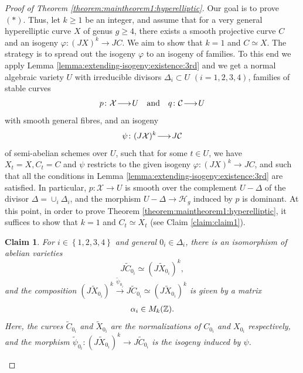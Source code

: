 \documentclass[a4paper,11pt,reqno]{amsart}
\makeatletter
\numberwithin{equation}{section}
\theoremstyle{plain}
\newtheorem{claim}[theorem]{Claim}
\theoremstyle{definition}
\newcommand{\Z}{\mathbb Z}
\let\rm\relax
\newcommand{\rm}[1]{{\mathrm{#1}}}
\newcommand{\ca}[1]{{\mathcal{#1}}}
\newcommand{\wt}[1]{{\widetilde{#1}}}
\renewcommand{\longrightarrow}{\xymatrix@1@=15pt{\ar[r]&}}
\renewcommand{\cong}{\simeq}
\newcommand{\set}[1]{\left\{ #1 \right\}}
\makeatother
\begin{document}
\begin{proof}[Proof of Theorem \ref{theorem:maintheorem1:hyperelliptic}]
Our goal is to prove \hyperlink{star}{$(\ast)$}. 
Thus, let $k \geq 1$ be an integer, and assume that for a very general hyperelliptic curve $X$ of genus $g \geq 4$, there exists a smooth projective curve $C$ and an isogeny $\varphi \colon (JX)^k \to JC$. 
We aim to show that $k=1$ and $C\cong X$.
The strategy is to spread out the isogeny $\varphi$ to an isogeny of families.
To this end we apply Lemma \ref{lemma:extending-isogeny:existence:3rd} and we get
 a normal algebraic variety $U$ with irreducible divisors $\Delta_i \subset U$ $(i = 1,2,3,4)$, families of stable curves
\[
    p \colon \ca X \longrightarrow U \quad \text{and} \quad q \colon \ca C \longrightarrow U
    \]
 with smooth general fibres, and an isogeny
\[
\psi \colon (J\ca X)^k \longrightarrow J\ca C
\]
of semi-abelian schemes over $U$, such that for some $t \in U$, we have $X_t = X, C_t = C$ and $\psi$ restricts to the given isogeny $\varphi \colon (JX)^k \to JC$, and such that all the conditions in Lemma \ref{lemma:extending-isogeny:existence:3rd} are satisfied. 
In particular, $p \colon \ca X \to U$ is smooth over the complement $U - \Delta$ of the divisor $\Delta = \cup_i \Delta_i$, and the morphism $U - \Delta \to \ca H_g$ induced by $p$ is dominant. At this point, in order to prove Theorem \ref{theorem:maintheorem1:hyperelliptic}, it suffices to show that $k = 1$ and $C_t \cong X_t$ (see Claim \ref{claim:claim1}).

\begin{claim} \label{claim:claim2}
For $i \in \set{1,2,3,4}$ and general $0_i \in \Delta_i$, there is an isomorphism of abelian varieties
\[
J\wt C_{0_i} \cong (J\wt X_{0_i})^k,
\]
and the composition $(J\wt X_{0_i})^k \xrightarrow{\wt \psi_{0_i}} J\wt C_{0_i} \cong (J\wt X_{0_i})^k$ is given by a matrix \begin{align} \label{align:matrix:alphai}\alpha_i \in \rm{M}_k(\Z).\end{align} Here, the curves $\wt C_{0_i}$ and $\wt X_{0_i}$ are the normalizations of $C_{0_i}$ and $X_{0_i}$ respectively, and the morphism $\wt \psi_{0_i} \colon (J \wt X_{0_i})^k \to J\wt C_{0_i}$ is the isogeny induced by $\psi$.     
\end{claim}


\end{proof}
\end{document}
